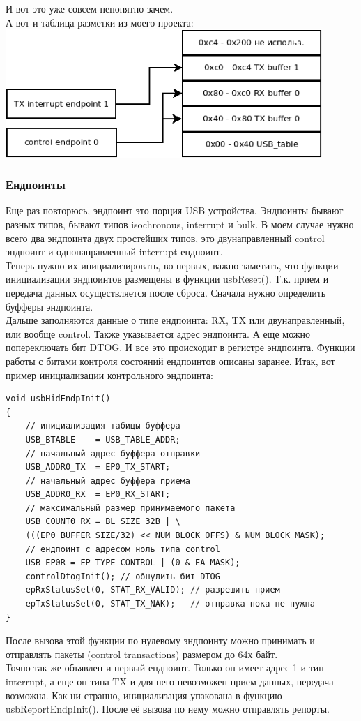 \documentclass[12pt,a4paper]{article}
\begin{document}
    И вот это уже совсем непонятно зачем.\\
    А вот и таблица разметки из моего проекта:\\
\includegraphics[width=12cm]{table.png}\\


\subsubsection{Ендпоинты}
    Еще раз повторюсь, эндпоинт это порция USB устройства. Эндпоинты бывают
    разных типов, бывают типов isochronous, interrupt и bulk. В моем случае
    нужно всего два эндпоинта двух простейших типов, это двунаправленный
    control эндпоинт и однонаправленный interrupt ендпоинт.\\
    Теперь нужно их инициализировать, во первых, важно заметить, что
    функции инициализации эндпоинтов размещены в функции usbReset(). Т.к.
    прием и передача данных осуществляется после сброса. Сначала нужно
    определить буфферы эндпоинта.\\
    Дальше заполняются данные о типе ендпоинта:
    RX, TX или двунаправленный, или вообще control. Также указывается адрес
    эндпоинта.
    А еще можно попереключать бит DTOG. И все это происходит в регистре
    эндпоинта. Функции работы с битами контроля состояний ендпоинтов описаны
    заранее. Итак, вот
    пример инициализации контрольного эндпоинта:
\lstset{language=c}
\begin{lstlisting}
void usbHidEndpInit()
{
    // инициализация табицы буффера
    USB_BTABLE    = USB_TABLE_ADDR;
    // начальный адрес буффера отправки
    USB_ADDR0_TX  = EP0_TX_START;
    // начальный адрес буффера приема
    USB_ADDR0_RX  = EP0_RX_START;
    // максимальный размер принимаемого пакета
    USB_COUNT0_RX = BL_SIZE_32B | \
    (((EP0_BUFFER_SIZE/32) << NUM_BLOCK_OFFS) & NUM_BLOCK_MASK);
    // ендпоинт с адресом ноль типа control
    USB_EP0R = EP_TYPE_CONTROL | (0 & EA_MASK);
    controlDtogInit(); // обнулить бит DTOG
    epRxStatusSet(0, STAT_RX_VALID); // разрешить прием
    epTxStatusSet(0, STAT_TX_NAK);   // отправка пока не нужна
}
\end{lstlisting}
    После вызова этой функции по нулевому эндпоинту можно принимать и
    отправлять пакеты (control transactions) размером до 64х байт.\\
    Точно так же объявлен и первый ендпоинт. Только он имеет адрес 1 и тип
    interrupt, а еще он типа TX и для него невозможен прием данных, передача возможна. Как
    ни странно, инициализация упакована в функцию usbReportEndpInit().
    После её вызова по нему можно отправлять репорты.
\end{document}
